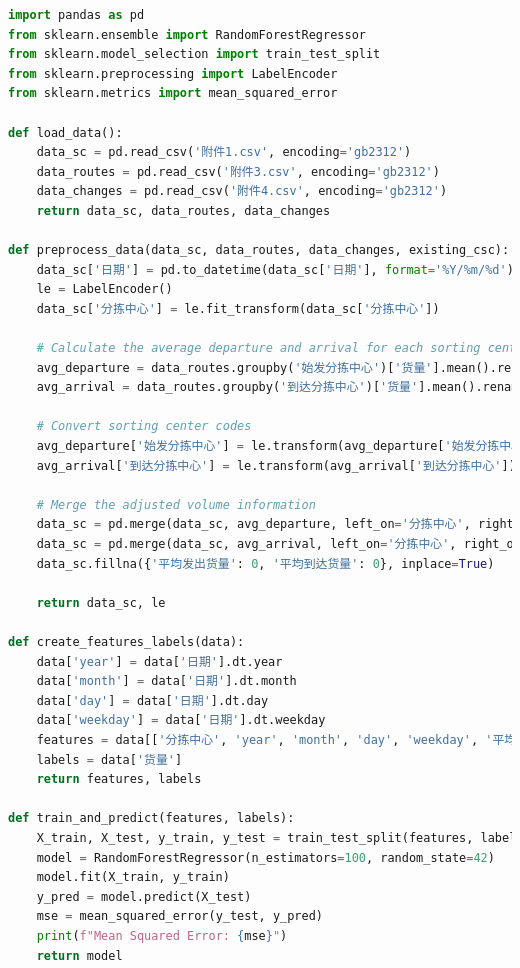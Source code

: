 \documentclass[UTF8,a4paper,10 pt]{article}%
\begin{document}
\begin{lstlisting}[language=python]
import pandas as pd
from sklearn.ensemble import RandomForestRegressor
from sklearn.model_selection import train_test_split
from sklearn.preprocessing import LabelEncoder
from sklearn.metrics import mean_squared_error

def load_data():
    data_sc = pd.read_csv('附件1.csv', encoding='gb2312')
    data_routes = pd.read_csv('附件3.csv', encoding='gb2312')
    data_changes = pd.read_csv('附件4.csv', encoding='gb2312')
    return data_sc, data_routes, data_changes

def preprocess_data(data_sc, data_routes, data_changes, existing_csc):
    data_sc['日期'] = pd.to_datetime(data_sc['日期'], format='%Y/%m/%d')
    le = LabelEncoder()
    data_sc['分拣中心'] = le.fit_transform(data_sc['分拣中心'])

    # Calculate the average departure and arrival for each sorting center
    avg_departure = data_routes.groupby('始发分拣中心')['货量'].mean().rename('平均发出货量').reset_index()
    avg_arrival = data_routes.groupby('到达分拣中心')['货量'].mean().rename('平均到达货量').reset_index()

    # Convert sorting center codes
    avg_departure['始发分拣中心'] = le.transform(avg_departure['始发分拣中心'])
    avg_arrival['到达分拣中心'] = le.transform(avg_arrival['到达分拣中心'])

    # Merge the adjusted volume information
    data_sc = pd.merge(data_sc, avg_departure, left_on='分拣中心', right_on='始发分拣中心', how='left')
    data_sc = pd.merge(data_sc, avg_arrival, left_on='分拣中心', right_on='到达分拣中心', how='left')
    data_sc.fillna({'平均发出货量': 0, '平均到达货量': 0}, inplace=True)

    return data_sc, le

def create_features_labels(data):
    data['year'] = data['日期'].dt.year
    data['month'] = data['日期'].dt.month
    data['day'] = data['日期'].dt.day
    data['weekday'] = data['日期'].dt.weekday
    features = data[['分拣中心', 'year', 'month', 'day', 'weekday', '平均发出货量', '平均到达货量']]
    labels = data['货量']
    return features, labels

def train_and_predict(features, labels):
    X_train, X_test, y_train, y_test = train_test_split(features, labels, test_size=0.2, random_state=42)
    model = RandomForestRegressor(n_estimators=100, random_state=42)
    model.fit(X_train, y_train)
    y_pred = model.predict(X_test)
    mse = mean_squared_error(y_test, y_pred)
    print(f"Mean Squared Error: {mse}")
    return model


\end{lstlisting}
\end{document}
